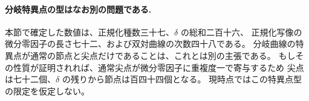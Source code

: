\paragraph{分岐特異点の型はなお別の問題である.}
本節で確定した数値は、正規化種数三十七、$\delta$ の総和二百十六、
正規化写像の微分零因子の長さ七十二、および双対曲線の次数四十八である。
分岐曲線の特異点が通常の節点と尖点だけであることは、これとは別の主張である。
もしその性質が証明されれば、通常尖点が微分零因子に重複度一で寄与するため
尖点は七十二個、$\delta$ の残りから節点は百四十四個となる。
現時点ではこの特異点型の限定を仮定しない。

